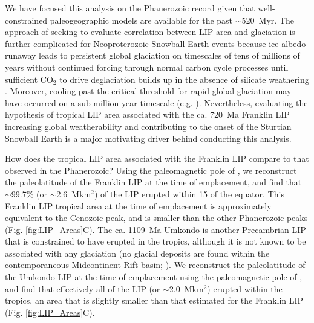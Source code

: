 \documentclass[11pt,letterpaper]{article}
\begin{document}
We have focused this analysis on the Phanerozoic record given that well-constrained paleogeographic models are available for the past $\sim$520~Myr. The approach of seeking to evaluate correlation between LIP area and glaciation is further complicated for Neoproterozoic Snowball Earth events because ice-albedo runaway leads to persistent global glaciation on timescales of tens of millions of years without continued forcing through normal carbon cycle processes until sufficient CO$_2$ to drive deglaciation builds up in the absence of silicate weathering \citep{Hoffman2017a}. Moreover, cooling past the critical threshold for rapid global glaciation may have occurred on a sub-million year timescale (e.g. \citealp{Macdonald2017a}). Nevertheless, evaluating the hypothesis of tropical LIP area associated with the ca. 720~Ma Franklin LIP increasing global weatherability and contributing to the onset of the Sturtian Snowball Earth is a major motivating driver behind conducting this analysis.

How does the tropical LIP area associated with the Franklin LIP compare to that observed in the Phanerozoic? Using the paleomagnetic pole of \citet{Denyszyn2009a}, we reconstruct the paleolatitude of the Franklin LIP at the time of emplacement, and find that $\sim$99.7\% (or $\sim$2.6~Mkm$^{2}$) of the LIP erupted within 15\textdegree\xspace of the equator. This Franklin LIP tropical area at the time of emplacement is approximately equivalent to the Cenozoic peak, and is smaller than the other Phanerozoic peaks (Fig. \ref{fig:LIP_Areas}C). The ca. 1109~Ma Umkondo is another Precambrian LIP that is constrained to have erupted in the tropics, although it is not known to be associated with any glaciation (no glacial deposits are found within the contemporaneous Midcontinent Rift basin; \citealp{Swanson-Hysell2019a}). We reconstruct the paleolatitude of the Umkondo LIP at the time of emplacement using the paleomagnetic pole of \citet{Swanson-Hysell2015b}, and find that effectively all of the LIP (or $\sim$2.0~Mkm$^{2}$) erupted within the tropics, an area that is slightly smaller than that estimated for the Franklin LIP (Fig. \ref{fig:LIP_Areas}C).
\end{document}

